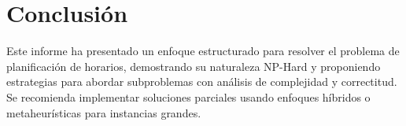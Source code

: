 \documentclass[12pt, a4paper]{article}
\begin{document}
\section{Conclusión}
Este informe ha presentado un enfoque estructurado para resolver el problema de planificación de horarios, demostrando su naturaleza NP-Hard y proponiendo estrategias para abordar subproblemas con análisis de complejidad y correctitud. Se recomienda implementar soluciones parciales usando enfoques híbridos o metaheurísticas para instancias grandes.
\end{document}
